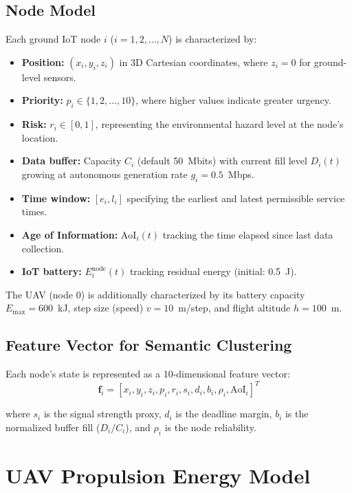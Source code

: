 \documentclass[12pt, a4paper, oneside]{report}
\newcommand{\vect}[1]{\mathbf{#1}}
\begin{document}
\subsection{Node Model}

Each ground IoT node $i$ ($i = 1, 2, \ldots, N$) is characterized by:
\begin{itemize}
    \item \textbf{Position:} $(x_i, y_i, z_i)$ in 3D Cartesian coordinates, where $z_i = 0$ for ground-level sensors.
    \item \textbf{Priority:} $p_i \in \{1, 2, \ldots, 10\}$, where higher values indicate greater urgency.
    \item \textbf{Risk:} $r_i \in [0, 1]$, representing the environmental hazard level at the node's location.
    \item \textbf{Data buffer:} Capacity $C_i$ (default 50~Mbits) with current fill level $D_i(t)$ growing at autonomous generation rate $g_i = 0.5$~Mbps.
    \item \textbf{Time window:} $[e_i, l_i]$ specifying the earliest and latest permissible service times.
    \item \textbf{Age of Information:} $\text{AoI}_i(t)$ tracking the time elapsed since last data collection.
    \item \textbf{IoT battery:} $E_i^{\text{node}}(t)$ tracking residual energy (initial: 0.5~J).
\end{itemize}

The UAV (node 0) is additionally characterized by its battery capacity $E_{\max} = 600$~kJ, step size (speed) $v = 10$~m/step, and flight altitude $h = 100$~m.

\subsection{Feature Vector for Semantic Clustering}

Each node's state is represented as a 10-dimensional feature vector:
\begin{equation}
\vect{f}_i = [x_i, y_i, z_i, p_i, r_i, s_i, d_i, b_i, \rho_i, \text{AoI}_i]^T
\label{eq:feature_vector}
\end{equation}

where $s_i$ is the signal strength proxy, $d_i$ is the deadline margin, $b_i$ is the normalized buffer fill ($D_i/C_i$), and $\rho_i$ is the node reliability.

\section{UAV Propulsion Energy Model}
\end{document}
